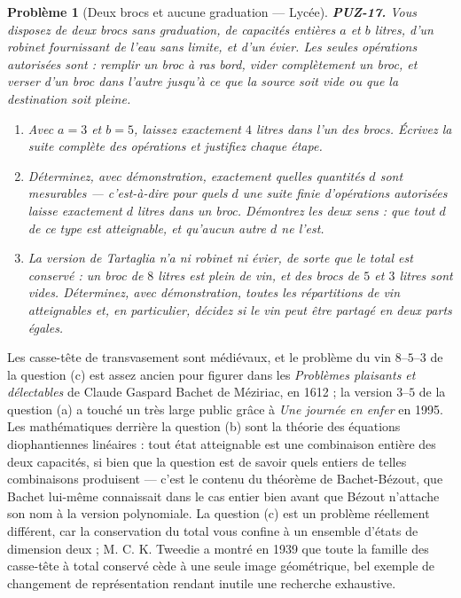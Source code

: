 \documentclass[11pt]{article}
\newtheorem{problem}{Problème}
\begin{document}
\begin{problem}[{Deux brocs et aucune graduation --- Lycée}]
\textbf{PUZ-17.} Vous disposez de deux brocs sans graduation, de capacités entières $ a $ et $ b $ litres, d'un robinet fournissant de l'eau sans limite, et d'un évier. Les seules opérations autorisées sont : remplir un broc à ras bord, vider complètement un broc, et verser d'un broc dans l'autre jusqu'à ce que la source soit vide ou que la destination soit pleine.
\begin{enumerate}
\item[(a)] Avec $ a = 3 $ et $ b = 5 $, laissez exactement $ 4 $ litres dans l'un des brocs. Écrivez la suite complète des opérations et justifiez chaque étape.
\item[(b)] Déterminez, avec démonstration, exactement quelles quantités $ d $ sont mesurables --- c'est-à-dire pour quels $ d $ une suite finie d'opérations autorisées laisse exactement $ d $ litres dans un broc. Démontrez les deux sens : que tout $ d $ de ce type est atteignable, et qu'aucun autre $ d $ ne l'est.
\item[(c)] La version de Tartaglia n'a ni robinet ni évier, de sorte que le total est conservé : un broc de $ 8 $ litres est plein de vin, et des brocs de $ 5 $ et $ 3 $ litres sont vides. Déterminez, avec démonstration, toutes les répartitions de vin atteignables et, en particulier, décidez si le vin peut être partagé en deux parts égales.
\end{enumerate}

\end{problem}

\noindent Les casse-tête de transvasement sont médiévaux, et le problème du vin $ 8 $--$ 5 $--$ 3 $ de la question (c) est assez ancien pour figurer dans les \textit{Problèmes plaisants et délectables} de Claude Gaspard Bachet de Méziriac, en 1612 ; la version $ 3 $--$ 5 $ de la question (a) a touché un très large public grâce à \textit{Une journée en enfer} en 1995. Les mathématiques derrière la question (b) sont la théorie des équations diophantiennes linéaires : tout état atteignable est une combinaison entière des deux capacités, si bien que la question est de savoir quels entiers de telles combinaisons produisent --- c'est le contenu du théorème de Bachet-Bézout, que Bachet lui-même connaissait dans le cas entier bien avant que Bézout n'attache son nom à la version polynomiale. La question (c) est un problème réellement différent, car la conservation du total vous confine à un ensemble d'états de dimension deux ; M. C. K. Tweedie a montré en 1939 que toute la famille des casse-tête à total conservé cède à une seule image géométrique, bel exemple de changement de représentation rendant inutile une recherche exhaustive.
\end{document}

